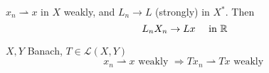 \begin{proposition}
    \(x_n \rightharpoonup x \) in \(X\) weakly, and \(L_n \to L\) (strongly) in \(X^*\). Then
    \[
        L_n X_n \to Lx \quad \text{ in } \mathbb{R}
    \]
\end{proposition}
\begin{proposition}
    \(X, Y\) Banach, \(T \in \mathcal{L}(X, Y)\)
    \[
        x_n \rightharpoonup x \text{ weakly } \Rightarrow Tx_n \rightharpoonup Tx \text{ weakly }
    \]
\end{proposition}